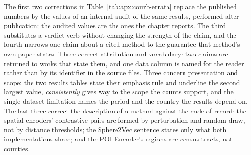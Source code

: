 The first two corrections in Table~\ref{tab:apx:courb-errata} replace the published
numbers by the values of an internal audit of the same results, performed after
publication; the audited values are the ones the chapter reports. The third substitutes a
verdict verb without changing the strength of the claim, and the fourth narrows one claim
about a cited method to the guarantee that method's own paper states. Three correct
attribution and vocabulary: two claims are returned to works that state them, and one data
column is named for the reader rather than by its identifier in the source files. Three
concern presentation and scope: the two results tables state their emphasis rule and
underline the second largest value, \emph{consistently} gives way to the scope the counts
support, and the single-dataset limitation names the period and the country the results
depend on. The last three correct the description of a method against the code of record:
the spatial encoders' contrastive pairs are formed by perturbation and random draw, not by
distance thresholds; the Sphere2Vec sentence states only what both implementations share;
and the POI Encoder's regions are census tracts, not counties.

